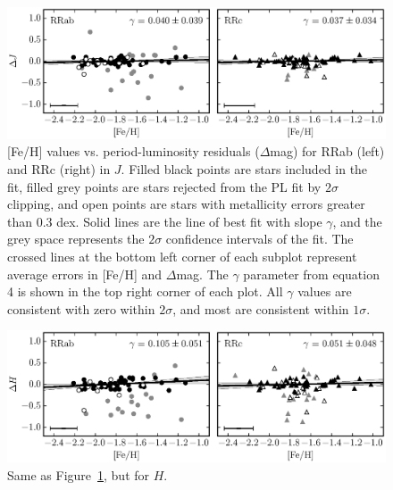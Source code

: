 \documentclass[a4paper,fleqn,usenatbib]{mnras}
\begin{document}
\begin{figure}
\begin{center}
\includegraphics[width=160mm]{../ocen_only_fitting/final_plots/metallicity_vs_residuals_J_sigclip.eps}
\caption{[Fe/H] values \citep{2016arXiv160904916B} vs. period-luminosity residuals ($\Delta$mag) for RRab (left) and RRc (right) in $J$. Filled black points are stars included in the fit, filled grey points are stars rejected from the PL fit by $2\sigma$ clipping, and open points are stars with metallicity errors greater than 0.3 dex. Solid lines are the line of best fit with slope $\gamma$, and the grey space represents the $2\sigma$ confidence intervals of the fit. The crossed lines at the bottom left corner of each subplot represent average errors in [Fe/H] and $\Delta$mag. The $\gamma$ parameter from equation 4 is shown in the top right corner of each plot. All $\gamma$ values are consistent with zero within $2\sigma$, and most are consistent within $1\sigma$.}
\label{fig:metallicity_residuals_j}
\end{center}
\end{figure}

\begin{figure}
\begin{center}
\includegraphics[width=160mm]{../ocen_only_fitting/final_plots/metallicity_vs_residuals_H_sigclip.eps}
\caption{Same as Figure~\ref{fig:metallicity_residuals_j}, but for $H$.}
\label{fig:metallicity_residuals_h}
\end{center}
\end{figure}
\end{document}
